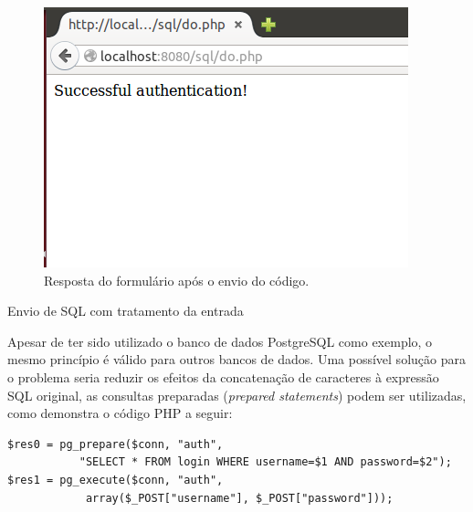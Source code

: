 \begin{frame}{}

  \begin{figure}
    \centering
    \includegraphics[scale=.5]{img/sql-rsp.png}
    \caption{Resposta do formulário após o envio do código.}
  \end{figure}
\end{frame}

\begin{frame}[fragile]{}{Envio de SQL com tratamento da entrada}

Apesar de ter sido utilizado o banco de dados PostgreSQL como exemplo,
o mesmo princípio é válido para outros bancos de dados.
Uma possível solução para o problema seria reduzir os efeitos da
concatenação de caracteres à expressão SQL original, as consultas
preparadas ({\it prepared statements}) podem ser utilizadas, como
demonstra o código PHP a seguir:

{\small
\begin{verbatim}
$res0 = pg_prepare($conn, "auth", 
           "SELECT * FROM login WHERE username=$1 AND password=$2");
$res1 = pg_execute($conn, "auth",  
            array($_POST["username"], $_POST["password"]));
\end{verbatim}
}

\end{frame}

